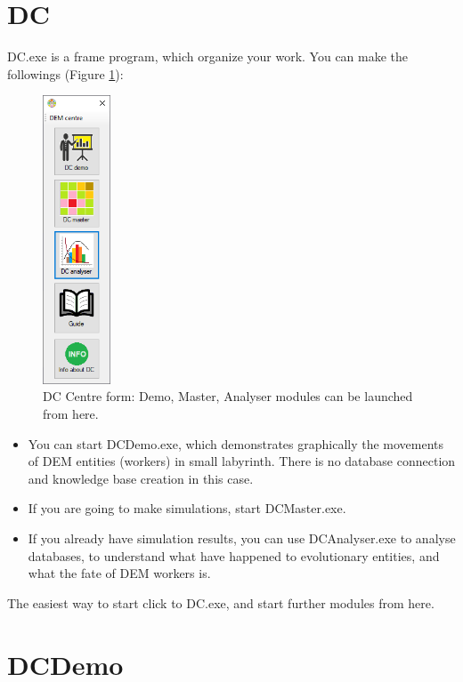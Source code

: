 \documentclass[a4paper,12pt]{article}
\begin{document}
\section{DC}

DC.exe is a frame program, which organize your work. You can make the followings (Figure \ref{fig:dcstart}):

\begin{figure}
	\centering
	\includegraphics[width=2cm]{dcstart.png}
	\caption{DC Centre form: Demo,  Master, Analyser modules can be launched from here.}
	\label{fig:dcstart}
\end{figure}



\begin{itemize}
	\item You can start DCDemo.exe, which demonstrates graphically the movements of DEM entities (workers) in small labyrinth. There is no database connection and knowledge base creation in this case.
	\item If you are going to make simulations, start DCMaster.exe.
	\item If you already have simulation results, you can use DCAnalyser.exe to analyse databases, to understand what have happened to evolutionary entities, and what the fate of DEM workers is.
\end{itemize}

The easiest way to start click to DC.exe, and start further modules from here.



\section{DCDemo}
\end{document}
